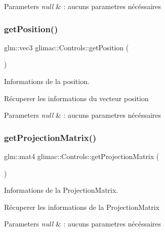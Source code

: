 \begin{DoxyParams}{Parameters}
{\em null} & \+: aucuns parametres nécéssaires \\
\hline
\end{DoxyParams}
\mbox{\label{classglimac_1_1Controls_a2f0ffddd68aec95f01abf802be75a686}} 
\subsubsection{\texorpdfstring{get\+Position()}{getPosition()}}
{\footnotesize\ttfamily glm\+::vec3 glimac\+::\+Controls\+::get\+Position (\begin{DoxyParamCaption}{ }\end{DoxyParamCaption})}



Informations de la position. 

Récuperer les informations du vecteur position


\begin{DoxyParams}{Parameters}
{\em null} & \+: aucuns parametres nécéssaires \\
\hline
\end{DoxyParams}
\mbox{\label{classglimac_1_1Controls_aeb14a40e7d273aec1b6095d8bde08437}} 
\subsubsection{\texorpdfstring{get\+Projection\+Matrix()}{getProjectionMatrix()}}
{\footnotesize\ttfamily glm\+::mat4 glimac\+::\+Controls\+::get\+Projection\+Matrix (\begin{DoxyParamCaption}{ }\end{DoxyParamCaption})}



Informations de la Projection\+Matrix. 

Récuperer les informations de la Projection\+Matrix


\begin{DoxyParams}{Parameters}
{\em null} & \+: aucuns parametres nécéssaires \\
\hline
\end{DoxyParams}
\mbox{\label{classglimac_1_1Controls_a65b6d95a26fab1a0fba7b3e0dfbf7178}} 
